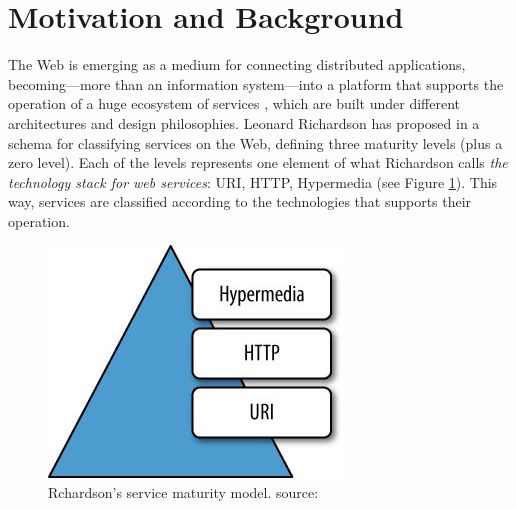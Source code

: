 \section{Motivation and Background}

\noindent The Web is emerging as a medium for connecting distributed applications, becoming---more than an information system---into a platform that
supports the operation of a huge ecosystem of services \cite{Webber:2010a}, which are built under different architectures and design philosophies. Leonard Richardson has proposed in \cite{Richardson:2008} a schema for classifying services on the Web, defining three maturity levels (plus a zero level). Each of the levels represents one element of what Richardson calls \emph{the technology stack for web services}: URI, HTTP, Hypermedia (see Figure \ref{richardsonModel}). This way, services are classified according to the technologies that supports their operation.

\begin{figure}[H]
\center\includegraphics[scale=0.7]{images/WS-MaturityModel}

\caption{Rchardson's service maturity model. {\scriptsize source: \cite{Webber:2010a}}}
\label{richardsonModel}
\end{figure}

